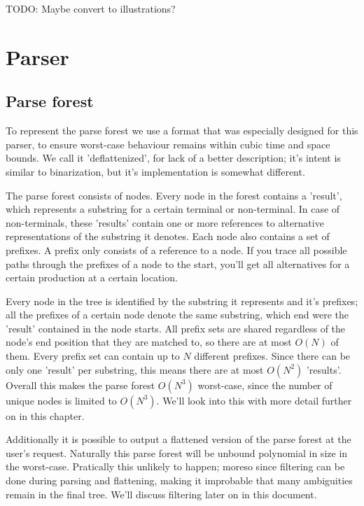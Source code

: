 \documentclass[a4paper,10pt]{article}
\begin{document}
TODO: Maybe convert to illustrations?

\section{Parser}

\subsection{Parse forest}

To represent the parse forest we use a format that was especially designed for this parser, to ensure worst-case behaviour remains within cubic time and space bounds. We call it 'deflattenized', for lack of a better description; it's intent is similar to binarization, but it's implementation is somewhat different.

The parse forest consists of nodes. Every node in the forest contains a 'result', which represents a substring for a certain terminal or non-terminal. In case of non-terminals, these 'results' contain one or more references to alternative representations of the substring it denotes. Each node also contains a set of prefixes. A prefix only consists of a reference to a node. If you trace all possible paths through the prefixes of a node to the start, you'll get all alternatives for a certain production at a certain location.

Every node in the tree is identified by the substring it represents and it's prefixes; all the prefixes of a certain node denote the same substring, which end were the 'result' contained in the node starts. All prefix sets are shared regardless of the node's end position that they are matched to, so there are at most $O(N)$ of them. Every prefix set can contain up to $N$ different prefixes. Since there can be only one 'result' per substring, this means there are at most $O(N^{2})$ 'results'. Overall this makes the parse forest $O(N^{3})$ worst-case, since the number of unique nodes is limited to $O(N^{3})$. We'll look into this with more detail further on in this chapter.

Additionally it is possible to output a flattened version of the parse forest at the user's request. Naturally this parse forest will be unbound polynomial in size in the worst-case. Pratically this unlikely to happen; moreso since filtering can be done during parsing and flattening, making it improbable that many ambiguities remain in the final tree. We'll discuss filtering later on in this document.
\end{document}
